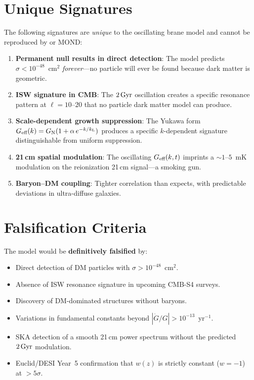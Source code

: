 \section{Unique Signatures}
\label{sec:unique_signatures}

The following signatures are \emph{unique} to the oscillating brane model and cannot be reproduced by \LCDM{} or MOND:

\begin{enumerate}
  \item \textbf{Permanent null results in direct detection}: The model predicts $\sigma < 10^{-48}$~cm$^2$ \emph{forever}---no particle will ever be found because dark matter is geometric.

  \item \textbf{ISW signature in CMB}: The $2\,\text{Gyr}$ oscillation creates a specific resonance pattern at $\ell = 10$--$20$ that no particle dark matter model can produce.

  \item \textbf{Scale-dependent growth suppression}: The Yukawa form $G_\text{eff}(k) = G_\text{N}(1 + \alpha\,e^{-k/k_\text{L}})$ produces a specific $k$-dependent signature distinguishable from uniform suppression.

  \item \textbf{21\,cm spatial modulation}: The oscillating $G_\text{eff}(k,t)$ imprints a $\sim 1$--$5$~mK modulation on the reionization 21\,cm signal---a smoking gun.

  \item \textbf{Baryon--DM coupling}: Tighter correlation than \LCDM{} expects, with predictable deviations in ultra-diffuse galaxies.
\end{enumerate}

\section{Falsification Criteria}
\label{sec:falsification}

The model would be \textbf{definitively falsified} by:

\begin{itemize}
  \item Direct detection of DM particles with $\sigma > 10^{-48}$~cm$^2$.
  \item Absence of ISW resonance signature in upcoming CMB-S4 surveys.
  \item Discovery of DM-dominated structures without baryons.
  \item Variations in fundamental constants beyond $|\dot{G}/G| > 10^{-13}$~yr$^{-1}$.
  \item SKA detection of a smooth 21\,cm power spectrum without the predicted $2\,\text{Gyr}$ modulation.
  \item Euclid/DESI Year~5 confirmation that $w(z)$ is strictly constant ($w = -1$) at $> 5\sigma$.
\end{itemize}

